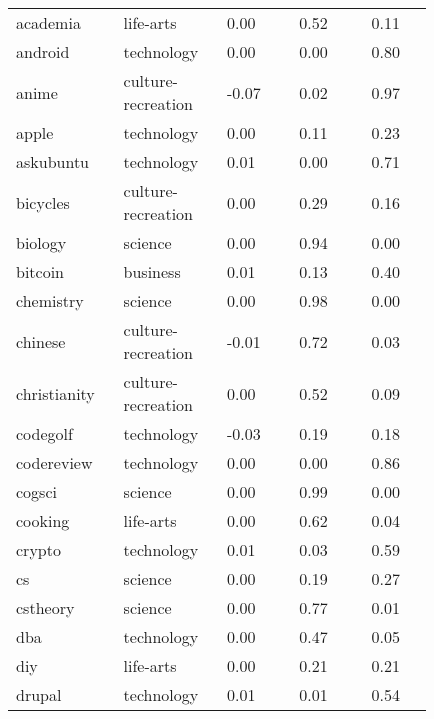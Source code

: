 \begin{longtabu}{@{}
	p{0.2\linewidth}
	p{0.2\linewidth}
	P{0.15\linewidth}
	P{0.15\linewidth}
	P{0.13\linewidth}@{}}
academia         & life-arts          & 0.00        & 0.52          & 0.11           \\
android          & technology         & 0.00        & 0.00          & 0.80           \\
anime            & culture-recreation & -0.07       & 0.02          & 0.97           \\
apple            & technology         & 0.00        & 0.11          & 0.23           \\
askubuntu        & technology         & 0.01        & 0.00          & 0.71           \\
bicycles         & culture-recreation & 0.00        & 0.29          & 0.16           \\
biology          & science            & 0.00        & 0.94          & 0.00           \\
bitcoin          & business           & 0.01        & 0.13          & 0.40           \\
chemistry        & science            & 0.00        & 0.98          & 0.00           \\
chinese          & culture-recreation & -0.01       & 0.72          & 0.03           \\
christianity     & culture-recreation & 0.00        & 0.52          & 0.09           \\
codegolf         & technology         & -0.03       & 0.19          & 0.18           \\
codereview       & technology         & 0.00        & 0.00          & 0.86           \\
cogsci           & science            & 0.00        & 0.99          & 0.00           \\
cooking          & life-arts          & 0.00        & 0.62          & 0.04           \\
crypto           & technology         & 0.01        & 0.03          & 0.59           \\
cs               & science            & 0.00        & 0.19          & 0.27           \\
cstheory         & science            & 0.00        & 0.77          & 0.01           \\
dba              & technology         & 0.00        & 0.47          & 0.05           \\
diy              & life-arts          & 0.00        & 0.21          & 0.21           \\
drupal           & technology         & 0.01        & 0.01          & 0.54           \\

\end{longtabu}
